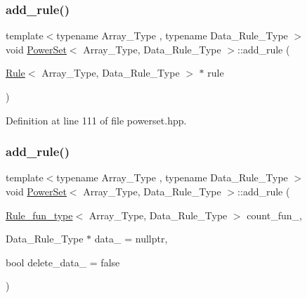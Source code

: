 \subsubsection{\texorpdfstring{add\+\_\+rule()}{add\_rule()}\hspace{0.1cm}{\footnotesize\ttfamily [2/3]}}
{\footnotesize\ttfamily template$<$typename Array\+\_\+\+Type , typename Data\+\_\+\+Rule\+\_\+\+Type $>$ \\
void \hyperlink{class_power_set}{Power\+Set}$<$ Array\+\_\+\+Type, Data\+\_\+\+Rule\+\_\+\+Type $>$\+::add\+\_\+rule (\begin{DoxyParamCaption}\item[{\hyperlink{class_rule}{Rule}$<$ Array\+\_\+\+Type, Data\+\_\+\+Rule\+\_\+\+Type $>$ $\ast$}]{rule }\end{DoxyParamCaption})\hspace{0.3cm}{\ttfamily [inline]}}



Definition at line 111 of file powerset.\+hpp.

\mbox{\label{class_power_set_aae5eae12186fff037efa3884ac2b3dcc}} 
\subsubsection{\texorpdfstring{add\+\_\+rule()}{add\_rule()}\hspace{0.1cm}{\footnotesize\ttfamily [3/3]}}
{\footnotesize\ttfamily template$<$typename Array\+\_\+\+Type , typename Data\+\_\+\+Rule\+\_\+\+Type $>$ \\
void \hyperlink{class_power_set}{Power\+Set}$<$ Array\+\_\+\+Type, Data\+\_\+\+Rule\+\_\+\+Type $>$\+::add\+\_\+rule (\begin{DoxyParamCaption}\item[{\hyperlink{typedefs_8hpp_a2e147c9c0e8b65be614c98a5dd400d5c}{Rule\+\_\+fun\+\_\+type}$<$ Array\+\_\+\+Type, Data\+\_\+\+Rule\+\_\+\+Type $>$}]{count\+\_\+fun\+\_\+,  }\item[{Data\+\_\+\+Rule\+\_\+\+Type $\ast$}]{data\+\_\+ = {\ttfamily nullptr},  }\item[{bool}]{delete\+\_\+data\+\_\+ = {\ttfamily false} }\end{DoxyParamCaption})\hspace{0.3cm}{\ttfamily [inline]}}



